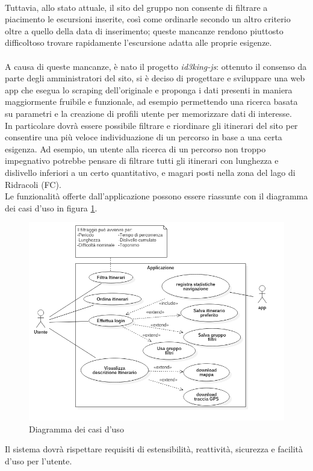 \documentclass[11pt]{report}
\begin{document}
\\Tuttavia, allo stato attuale, il sito del gruppo non consente di filtrare a piacimento le escursioni inserite, così come ordinarle secondo un altro criterio oltre a quello della data di inserimento; queste mancanze rendono piuttosto difficoltoso trovare rapidamente l'escursione adatta alle proprie esigenze.
\\\\A causa di queste mancanze, è nato il progetto \textit{id3king-js}: ottenuto il consenso da parte degli amministratori del sito, si è deciso di progettare e sviluppare una web app che esegua lo scraping dell'originale e proponga i dati presenti in maniera maggiormente fruibile e funzionale, ad esempio permettendo una ricerca basata su parametri e la creazione di profili utente per memorizzare dati di interesse.
\\In particolare dovrà essere possibile filtrare e riordinare gli itinerari del sito per consentire una più veloce individuazione di un percorso in base a una certa esigenza.
Ad esempio, un utente alla ricerca di un percorso non troppo impegnativo potrebbe pensare di filtrare tutti gli itinerari con lunghezza e dislivello inferiori a un certo quantitativo, e magari posti nella zona del lago di Ridracoli (FC).
\\Le funzionalità offerte dall'applicazione possono essere riassunte con il diagramma dei casi d'uso in figura \ref{use_case_diagram}.
\begin{figure}
	\centering
	\includegraphics[scale=0.5]{use_case_diagram}
	\caption{Diagramma dei casi d'uso \label{use_case_diagram}}
\end{figure}
Il sistema dovrà rispettare requisiti di estensibilità, reattività, sicurezza e facilità d'uso per l'utente.
\end{document}
